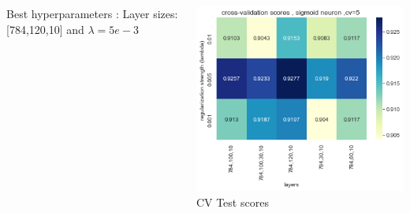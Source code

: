 \documentclass[12pt,t]{beamer}
\begin{document}
\begin{frame}[t]
\begin{columns}
\begin{column}[T]{0.4\linewidth}
            \vspace{10pt}
            Best hyperparameters : Layer sizes: [784,120,10] and $\lambda = 5e-3$
        \end{column}
        \begin{column}[T]{0.6\linewidth}
            \includegraphics[width=\linewidth]{sigmoid/cvScore.png}
            \centering CV Test scores
        \end{column}
    \end{columns}
    

    

\end{frame}
\end{document}
